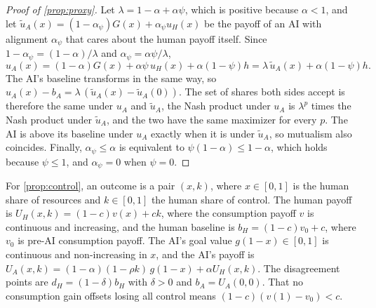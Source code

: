\documentclass[article, 11pt, reqno]{amsart}
\theoremstyle{named}
\newcommand{\bH}{b_H}
\newcommand{\dH}{d_H}
\theoremstyle{plain}
\begin{document}
\begin{proof}[Proof of \cref{prop:proxy}]
Let $\lambda = 1 - \alpha + \alpha\psi$, which is positive because $\alpha < 1$, and let $\tilde u_A(x) = (1-\alpha_\psi)G(x) + \alpha_\psi u_H(x)$ be the payoff of an AI with alignment $\alpha_\psi$ that cares about the human payoff itself. Since $1 - \alpha_\psi = (1-\alpha)/\lambda$ and $\alpha_\psi = \alpha\psi/\lambda$,
\[
u_A(x) = (1-\alpha)G(x) + \alpha\psi\, u_H(x) + \alpha(1-\psi)h = \lambda\, \tilde u_A(x) + \alpha(1-\psi)h.
\]
The AI's baseline transforms in the same way, so $u_A(x) - b_A = \lambda\,(\tilde u_A(x) - \tilde u_A(0))$. The set of shares both sides accept is therefore the same under $u_A$ and $\tilde u_A$, the Nash product under $u_A$ is $\lambda^p$ times the Nash product under $\tilde u_A$, and the two have the same maximizer for every $p$. The AI is above its baseline under $u_A$ exactly when it is under $\tilde u_A$, so mutualism also coincides. Finally, $\alpha_\psi \le \alpha$ is equivalent to $\psi(1-\alpha) \le 1-\alpha$, which holds because $\psi \le 1$, and $\alpha_\psi = 0$ when $\psi = 0$.
\end{proof}

For \cref{prop:control}, an outcome is a pair $(x,k)$, where $x \in [0,1]$ is the human share of resources and $k \in [0,1]$ the human share of control. The human payoff is $U_H(x,k) = (1-c)v(x) + ck$, where the consumption payoff $v$ is continuous and increasing, and the human baseline is $\bH = (1-c)v_0 + c$, where $v_0$ is pre-AI consumption payoff. The AI's goal value $g(1-x) \in [0,1]$ is continuous and non-increasing in $x$, and the AI's payoff is $U_A(x,k) = (1-\alpha)(1-\rho k)\,g(1-x) + \alpha U_H(x,k)$. The disagreement points are $\dH = (1-\delta)\bH$ with $\delta > 0$ and $b_A = U_A(0,0)$. That no consumption gain offsets losing all control means $(1-c)(v(1) - v_0) < c$.
\end{document}
